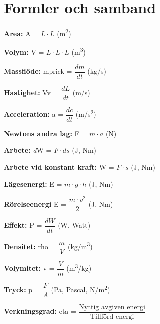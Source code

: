 \section*{Formler och samband}
	\textbf{Area:} \acrshort{A} = $L\cdot L $  (m\textsuperscript{2}) \par 
	\textbf{Volym:} \acrshort{V} = $L\cdot L\cdot L $   (m\textsuperscript{3}) \par
	\textbf{Massflöde:} \acrshort{mprick} = $\dfrac{dm}{dt}$  (kg/s) \par
	\textbf{Hastighet:} \acrshort{Vv} = $\dfrac{dL}{dt} $  (m/s) \par
	\textbf{Acceleration:} \acrshort{a} = $\dfrac{dc}{dt} $   (m/s\textsuperscript{2}) \par
	\textbf{Newtons andra lag: } \acrshort{F} = $m \cdot a$ (N) \par
	\textbf{Arbete:} \textit{d}\acrshort{W} = $F\cdot ds  $  (J, Nm) \par
	\textbf{Arbete vid konstant kraft:} \acrshort{W} = $ F \cdot s $  (J, Nm) \par
	\textbf{Lägesenergi:} \acrshort{E} = $ m \cdot g \cdot h  $  (J, Nm) \par
	\textbf{Rörelseenergi} \acrshort{E} = $ \dfrac{m \cdot v^2}{2}  $  (J, Nm) \par
	\textbf{Effekt:} \acrshort{P} = $\dfrac{dW}{dt} $  (W, Watt) \par
	\textbf{Densitet:} \acrshort{rho} = $\dfrac{m}{V} $  (kg/m\textsuperscript{3}) \par
	\textbf{Volymitet:} \acrshort{v} = $\dfrac{V}{m} $  (m\textsuperscript{3}/kg) \par
	\textbf{Tryck:} \acrshort{p} = $ \dfrac{F}{A} $   (Pa, Pascal, N/m\textsuperscript{2}) \par
	\textbf{Verkningsgrad:} \acrshort{eta} = $\dfrac{\text{Nyttig avgiven energi}}{\text{Tillförd energi}} $ \par
